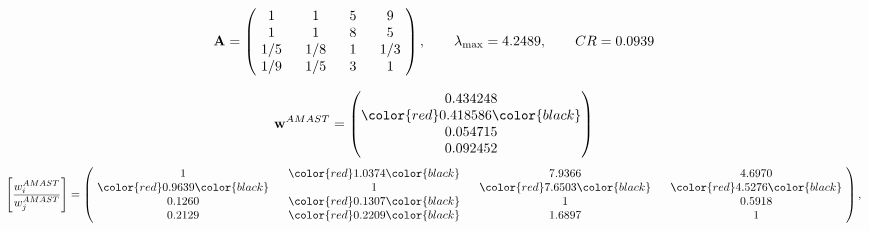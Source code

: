 \begin{example}
\begin{equation*}
\mathbf{A} =
\begin{pmatrix}
$\,\,$ 1 $\,\,$ & $\,\,$1$\,\,$ & $\,\,$5$\,\,$ & $\,\,$9 $\,\,$ \\
$\,\,$ 1 $\,\,$ & $\,\,$ 1 $\,\,$ & $\,\,$8$\,\,$ & $\,\,$5 $\,\,$ \\
$\,\,$ 1/5$\,\,$ & $\,\,$ 1/8$\,\,$ & $\,\,$ 1 $\,\,$ & $\,\,$ 1/3 $\,\,$ \\
$\,\,$ 1/9$\,\,$ & $\,\,$ 1/5$\,\,$ & $\,\,$3$\,\,$ & $\,\,$ 1  $\,\,$ \\
\end{pmatrix},
\qquad
\lambda_{\max} =
4.2489,
\qquad
CR = 0.0939
\end{equation*}

\begin{equation*}
\mathbf{w}^{AMAST} =
\begin{pmatrix}
0.434248\\
\color{red} 0.418586\color{black} \\
0.054715\\
0.092452
\end{pmatrix}\end{equation*}
\begin{equation*}
\left[ \frac{{w}^{AMAST}_i}{{w}^{AMAST}_j} \right] =
\begin{pmatrix}
$\,\,$ 1 $\,\,$ & $\,\,$\color{red} 1.0374\color{black} $\,\,$ & $\,\,$7.9366$\,\,$ & $\,\,$4.6970$\,\,$ \\
$\,\,$\color{red} 0.9639\color{black} $\,\,$ & $\,\,$ 1 $\,\,$ & $\,\,$\color{red} 7.6503\color{black} $\,\,$ & $\,\,$\color{red} 4.5276\color{black}   $\,\,$ \\
$\,\,$0.1260$\,\,$ & $\,\,$\color{red} 0.1307\color{black} $\,\,$ & $\,\,$ 1 $\,\,$ & $\,\,$0.5918 $\,\,$ \\
$\,\,$0.2129$\,\,$ & $\,\,$\color{red} 0.2209\color{black} $\,\,$ & $\,\,$1.6897$\,\,$ & $\,\,$ 1  $\,\,$ \\
\end{pmatrix},
\end{equation*}


\end{example}

